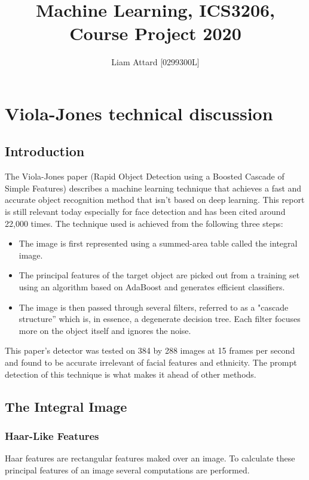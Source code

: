 \documentclass[12pt, letterpaper]{article}
\title{Machine Learning, ICS3206, Course Project 2020}
\author{Liam Attard [0299300L]}
\date{}
\begin{document}
    \maketitle

    \section{Viola-Jones technical discussion}
        \subsection{Introduction}
            The Viola-Jones paper (Rapid Object Detection using a
            Boosted Cascade of Simple Features) describes a machine
            learning technique that achieves a fast and accurate
            object recognition method that isn’t based on deep learning.
            This report is still relevant today especially for face
            detection and has been cited around 22,000 times. The
            technique used is achieved from the following three steps:
            \begin{itemize}
                \item The image is first represented using a summed-area table
                called the integral image.
                \item The principal features of the target object are picked
                out from a training set using an algorithm based on AdaBoost
                and generates efficient classifiers.
                \item The image is then passed through several filters, 
                referred to as a "cascade structure” which is, in essence, a
                degenerate decision tree. Each filter focuses more on the
                object itself and ignores the noise.

            \end{itemize}
            This paper’s detector was tested on 384 by 288 images at 15 frames
            per second and found to be accurate irrelevant of facial features 
            and ethnicity. The prompt detection of this technique is what
            makes it ahead of other methods.

        \subsection{The Integral Image}
            \subsubsection{Haar-Like Features}
                Haar features are rectangular features maked over an image.
                To calculate these principal features of an image several 
                computations are performed. 
\end{document}
